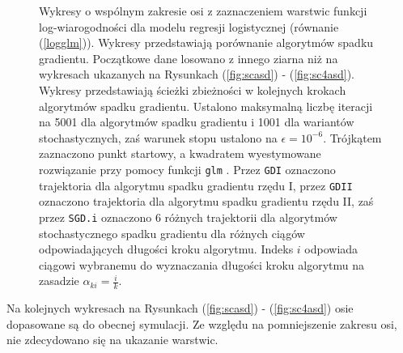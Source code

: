 \begin{figure}[h!]
\begin{center}
\begin{subfigure}[h!]{0.45\textwidth}
            \end{subfigure}
\end{center}
\caption[Porównanie algorytmów spadku gradientu o wspólnym zakresie osi.]{\label{fig:sc5asd} Wykresy o wspólnym zakresie osi z zaznaczeniem warstwic funkcji log-wiarogodności dla modelu regresji logistycznej (równanie (\ref{logglm})). Wykresy przedstawiają porównanie algorytmów spadku gradientu. Początkowe dane losowano z innego ziarna niż na wykresach ukazanych na Rysunkach (\ref{fig:scasd}) - (\ref{fig:sc4asd}). Wykresy przedstawiają ścieżki zbieżności w kolejnych krokach algorytmów spadku gradientu. Ustalono maksymalną liczbę iteracji na 5001 dla algorytmów spadku gradientu i 1001 dla wariantów stochastycznych, zaś warunek stopu ustalono na $\epsilon=10^{-6}$. Trójkątem zaznaczono punkt startowy, a kwadratem wyestymowane rozwiązanie przy pomocy funkcji \texttt{glm} \cite{glmglm}. Przez \texttt{GDI} oznaczono trajektoria dla algorytmu spadku gradientu rzędu I, przez \texttt{GDII} oznaczono trajektoria dla algorytmu spadku gradientu rzędu II, zaś przez \texttt{SGD.i} oznaczono 6 różnych trajektorii dla algorytmów stochastycznego spadku gradientu dla różnych ciągów odpowiadających długości kroku algorytmu. Indeks $i$ odpowiada ciągowi wybranemu do wyznaczania długości kroku algorytmu na zasadzie $\alpha_{ki} = \frac{i}{k}$.}
\end{figure}

Na kolejnych wykresach na Rysunkach (\ref{fig:scasd}) - (\ref{fig:sc4asd}) osie dopasowane są do obecnej symulacji. Ze względu na pomniejszenie zakresu osi, nie zdecydowano się na ukazanie warstwic.

\newpage


